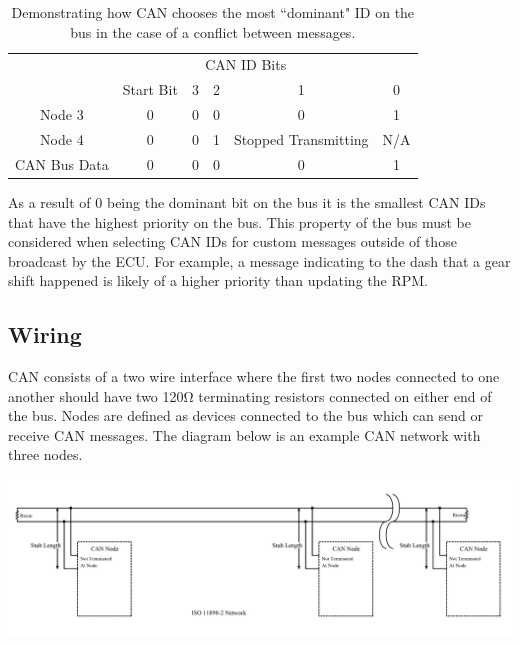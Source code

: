 \documentclass[letterpaper]{article}
\begin{document}
\begin{center}
  \begin{table}
  \begin{tabular}{c|c|c|c|c|c|}
    \cline{2-6}
      & \multicolumn{4}{c}{CAN ID Bits} & \\
    \cline{2-6}
      & Start Bit & 3 & 2 & 1 & 0\\
    \cline{1-6}
      \multicolumn{1}{|c|}{Node 3} & 0 & 0 & 0 & 0 & 1 \\
    \cline{1-6}
      \multicolumn{1}{|c|}{Node 4} & 0 & 0 & 1 & Stopped Transmitting & N/A \\
    \cline{1-6}
      \multicolumn{1}{|c|}{CAN Bus Data} & 0 & 0 & 0 & 0 & 1 \\
    \hline
  \end{tabular}
  \caption{
  \label{tab:Address Conflict Resolution}
    Demonstrating how CAN chooses the most ``dominant" ID on the bus in the
    case of a conflict between messages.
  }
  \end{table}
\end{center}

As a result of 0 being the dominant bit on the bus it is the smallest
CAN IDs that have the highest priority on the bus. This property of the bus must
be considered when selecting CAN IDs for custom messages outside of those
broadcast by the ECU. For example, a message indicating to the dash that a gear
shift happened is likely of a higher priority than updating the RPM.

\subsection{Wiring}
CAN consists of a two wire interface where the first two nodes connected to one
another should have two 120\si{\ohm} terminating resistors connected on either
end of the bus. Nodes are defined as devices connected to the bus which can send
or receive CAN messages. The diagram below is an example CAN network with three nodes.

\begin{center}
  \includegraphics[width=\textwidth]{CAN-network-diagram}
\end{center}
\end{document}
